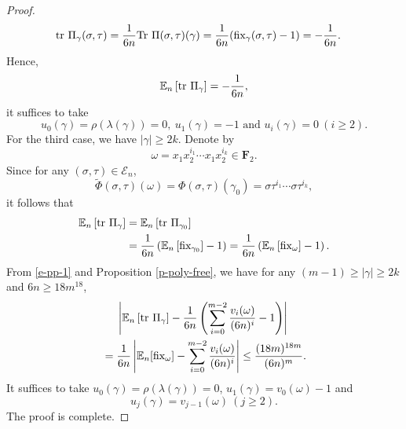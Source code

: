 \documentclass{amsart}
\theoremstyle{plain}
\theoremstyle{definition}
\theoremstyle{remark}
\begin{document}
\begin{proof}
\begin{align*}
        \textnormal{tr }\Pi_\gamma(\sigma,\tau)&=\frac{1}{6n}\textnormal{Tr }\Pi(\sigma,\tau)(\gamma)=\frac{1}{6n}(\textnormal{fix}_\gamma(\sigma,\tau)-1)=-\frac{1}{6n}.
        \end{align*}
        Hence,
        $$\mathbb{E}_n\left[\textnormal{tr }\Pi_\gamma\right]=-\frac{1}{6n},$$
        it suffices to take 
        $$u_0(\gamma)=\rho(\lambda(\gamma))=0,\ u_1(\gamma)=-1\text{ and }u_i(\gamma)=0\ (i\geq 2).$$
        For the third case, we have $|\gamma|\geq 2k$. Denote by 
        $$\omega=x_1x_2^{i_1}\cdots x_1x_2^{i_k}\in\textbf{F}_2.$$
        Since for any $(\sigma,\tau)\in\mathcal{E}_n$,
        $$\tilde{\Phi}(\sigma,\tau)(\omega)=\Phi(\sigma,\tau)(\gamma_0)=\sigma\tau^{i_1}\cdots \sigma\tau^{i_k},$$  it follows that
        \begin{equation}
        \begin{aligned}\label{e-pp-1}
            \mathbb{E}_n\left[\textnormal{tr } \Pi_\gamma\right]&=\mathbb{E}_n\left[\textnormal{tr } \Pi_{\gamma_0}\right]\\
            &=\frac{1}{6n}\left(\mathbb{E}_n\left[\textnormal{fix}_{\gamma_0}\right]-1\right)=\frac{1}{6n}\left(\mathbb{E}_n\left[\textnormal{fix}_{\omega}\right]-1\right).
           \end{aligned}
           \end{equation}
            From \eqref{e-pp-1} and Proposition \ref{p-poly-free}, we have for any $(m-1)\geq |\gamma|\geq 2k$ and $6n\geq 18m^{18}$,
           \begin{align*}
               &\ \ \ \ \left|\mathbb{E}_n\left[\textnormal{tr }\Pi_\gamma\right]-\frac{1}{6n}\left(\sum\limits_{i=0}^{m-2}\frac{v_i(\omega)}{(6n)^i}-1\right)\right|\\
               &=\frac{1}{6n}\left|\mathbb{E}_n[\textnormal{fix}_{\omega}]-\sum\limits_{i=0}^{m-2}\frac{v_i(\omega)}{(6n)^i}\right|\leq\frac{(18m)^{18m}}{(6n)^m}.
           \end{align*}
         It suffices to take $u_0(\gamma)=\rho(\lambda(\gamma))=0$, $u_1(\gamma)=v_0(\omega)-1$ and 
         $$u_j(\gamma)=v_{j-1}(\omega)\ (j\geq 2).$$
         The proof is complete.
    \end{proof} 
    
\end{document}
